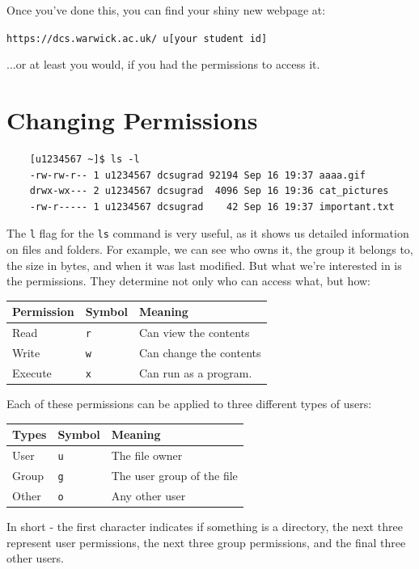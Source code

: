 \documentclass[a4paper,11pt,parskip=half-]{scrartcl}
\begin{document}
Once you've done this, you can find your shiny new webpage at:

\qquad \texttt{https://dcs.warwick.ac.uk/~u[your student id]}

...or at least you would, if you had the permissions to access it.

\section*{Changing Permissions}

\begin{verbatim}
    [u1234567 ~]$ ls -l
    -rw-rw-r-- 1 u1234567 dcsugrad 92194 Sep 16 19:37 aaaa.gif
    drwx-wx--- 2 u1234567 dcsugrad  4096 Sep 16 19:36 cat_pictures
    -rw-r----- 1 u1234567 dcsugrad    42 Sep 16 19:37 important.txt
\end{verbatim}

The \texttt{l} flag for the \texttt{ls} command is very useful, as it shows us detailed information on files and folders. 
For example, we can see who owns it, the group it belongs to, the size in bytes, and when it was last modified. 
But what we're interested in is the permissions. 
They determine not only who can access what, but how:

\centering
\begin{tabular}{l|l|l}
    Permission & Symbol & Meaning \\
    \hline
    Read & \texttt{r} & Can view the contents \\
    Write & \texttt{w} & Can change the contents \\
    Execute & \texttt{x} & Can run as a program.
\end{tabular}

\raggedright

Each of these permissions can be applied to three different types of users:

\centering
\begin{tabular}{l|l|l}
    Types & Symbol & Meaning \\
    \hline
    User & \texttt{u} & The file owner \\
    Group & \texttt{g} & The user group of the file \\
    Other & \texttt{o} & Any other user
\end{tabular}

\raggedright

In short - the first character indicates if something is a directory, the next three represent user permissions, the next three group permissions, and the final three other users.
\end{document}
